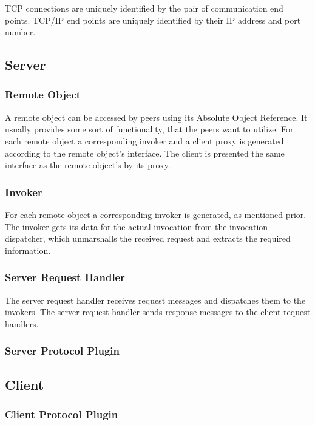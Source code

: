 TCP connections are uniquely identified by the pair of communication end points.
TCP/IP end points are uniquely identified by their IP address and port number.

\subsection{Server}

\subsubsection{Remote Object}
A remote object can be accessed by peers using its Absolute Object Reference. It usually provides some sort of functionality, that the peers want to utilize. For each remote object a corresponding invoker and a client proxy is generated according to the remote object's interface. The client is presented the same interface as the remote object's by its proxy.

\subsubsection{Invoker}
For each remote object a corresponding invoker is generated, as mentioned prior. The invoker gets its data for the actual invocation from the invocation dispatcher, which unmarshalls the received request and extracts the required information.

\subsubsection{Server Request Handler}

The server request handler receives request messages and dispatches them to the invokers.
The server request handler sends response messages to the client request handlers.

\subsubsection{Server Protocol Plugin}

\subsection{Client}

\subsubsection{Client Protocol Plugin}

